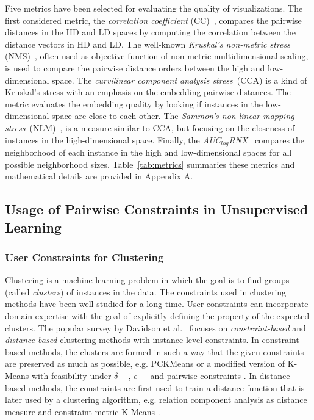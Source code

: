 Five metrics have been selected for evaluating the quality of visualizations. 
The first considered metric, the \emph{correlation coefficient} (CC)~\cite{geng2005}, compares the pairwise distances in the HD and LD spaces by computing the correlation between the distance vectors in HD and LD. The well-known \emph{Kruskal's non-metric stress} (NMS)~\cite{kruskal1964}, often used as objective function of non-metric multidimensional scaling, is used to compare the pairwise distance orders between the high and low-dimensional space. The \emph{curvilinear component analysis stress}~(CCA) \cite{demartines1997} is a kind of Kruskal's stress with an emphasis on the embedding pairwise distances. The metric evaluates the embedding quality by looking if instances in the low-dimensional space are close to each other. The \emph{Sammon's non-linear mapping stress}~(NLM)~\cite{sammon1969}, is a measure similar to CCA, but focusing on the closeness of instances in the high-dimensional space. Finally, the \emph{AUC$_{log}$RNX}~\cite{lee2015} compares the neighborhood of each instance in the high and low-dimensional spaces for all possible neighborhood sizes. Table~\ref{tab:metrics} summaries these metrics and mathematical details are provided in Appendix A. 


\subsection{Usage of Pairwise Constraints in Unsupervised Learning}

\subsubsection{User Constraints for Clustering}
\label{subsec:constraints_clustering}

Clustering is a machine learning problem in which the goal is to find groups (called \emph{clusters}) of instances in the data. The constraints used in clustering methods have been well studied for a long time. User constraints can incorporate domain expertise with the goal of explicitly defining the property of the expected clusters.
The popular survey by Davidson et al.~\cite{Davidson2007surveyClt} focuses on \emph{constraint-based} and \emph{distance-based} clustering methods with instance-level constraints.
In constraint-based methods, the clusters are formed in such a way that the given constraints are preserved as much as possible, e.g. PCKMeans \cite{basu2004active} or a modified version of K-Means with feasibility under $\delta-$, $\epsilon-$ and pairwise constraints \cite{davidson2005clustering}.
In distance-based methods, the constraints are first used to train a distance function that is later used by a clustering algorithm, e.g. relation component analysis as distance measure \cite{bar2003learning} and constraint metric K-Means \cite{xing2003distance}.

